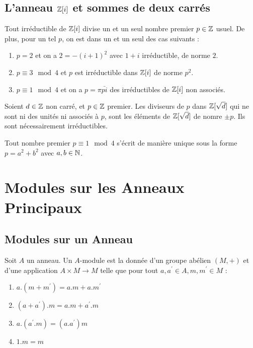 \documentclass{cours}
\begin{document}
\subsection{L'anneau $\mathbb{Z}[i]$ et sommes de deux carrés}
\begin{theorem}
    Tout irréductible de $\mathbb{Z}[i]$ divise un et un seul nombre premier $p\in \mathbb{Z}$ usuel. De plus, pour un tel $p$, on est dans un et un seul des cas suivants : 
    \begin{enumerate}
        \item $p = 2$ et on a $2 = -(i + 1)^{2}$ avec $1 + i$ irréductible, de norme $2$. 
        \item $p\equiv 3 \mod 4$ et $p$ est irréductible dans $\mathbb{Z}[i]$ de norme $p^{2}$.
        \item $p \equiv 1 \mod 4$ et on a $p = \pi \bar{pi}$ des irréductibles de $\mathbb{Z}[i]$ non associés. 
    \end{enumerate}
\end{theorem}

\begin{lemma}
    Soient $d \in \mathbb{Z}$ non carré, et $p \in \mathbb{Z}$ premier. Les diviseurs de $p$ dans $\mathbb{Z}[\sqrt{d}]$ qui ne sont ni des unités ni associés à $p$, sont les éléments de $\mathbb{Z}[\sqrt{d}]$ de nomre $\pm p$. Ils sont nécessairement irréductibles. 
\end{lemma}

\begin{proposition}
    Tout nombre premier $p \equiv 1 \mod 4$ s'écrit de manière unique sous la forme $p = a^{2} + b^{2}$ avec $a, b \in \mathbb{N}$.
\end{proposition}

\section{Modules sur les Anneaux Principaux}
\subsection{Modules sur un Anneau}
\begin{definition}
    Soit $A$ un anneau. Un $A$-module est la donnée d'un groupe abélien $\left(M, +\right)$ et d'une application $A \times M \rightarrow M$ telle que pour tout $a, a^{'} \in A, m, m^{'} \in M$ :
    \begin{enumerate}
        \item $a.(m+m^{'}) = a.m + a.m^{'}$
        \item $(a+a^{'}).m = a.m + a^{'}.m$
        \item $a.(a^{'}.m) = (a.a^{'})m$
        \item $1.m = m$
    \end{enumerate}
\end{definition}
\end{document}
